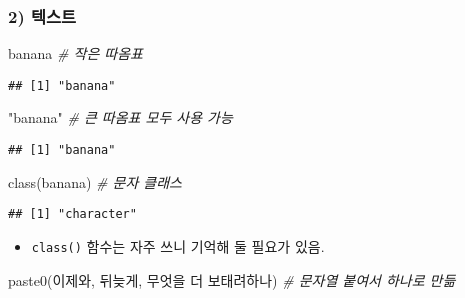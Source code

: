 \documentclass[
  12,
]{article}
\newenvironment{Shaded}{\begin{snugshade}}{\end{snugshade}}
\newcommand{\CommentTok}[1]{\textcolor[rgb]{0.56,0.35,0.01}{\textit{#1}}}
\newcommand{\FunctionTok}[1]{\textcolor[rgb]{0.00,0.00,0.00}{#1}}
\newcommand{\NormalTok}[1]{#1}
\newcommand{\StringTok}[1]{\textcolor[rgb]{0.31,0.60,0.02}{#1}}
\providecommand{\tightlist}{%
  \setlength{\itemsep}{0pt}\setlength{\parskip}{0pt}}
\begin{document}
\hypertarget{uxd14duxc2a4uxd2b8}{%
\subsubsection{2) 텍스트}\label{uxd14duxc2a4uxd2b8}}

\begin{Shaded}
\begin{Highlighting}[]
\StringTok{\textquotesingle{}banana\textquotesingle{}} \CommentTok{\# 작은 따옴표}
\end{Highlighting}
\end{Shaded}

\begin{verbatim}
## [1] "banana"
\end{verbatim}

\begin{Shaded}
\begin{Highlighting}[]
\StringTok{"banana"} \CommentTok{\# 큰 따옴표 모두 사용 가능}
\end{Highlighting}
\end{Shaded}

\begin{verbatim}
## [1] "banana"
\end{verbatim}

\begin{Shaded}
\begin{Highlighting}[]
\FunctionTok{class}\NormalTok{(}\StringTok{\textquotesingle{}banana\textquotesingle{}}\NormalTok{) }\CommentTok{\# 문자 클래스}
\end{Highlighting}
\end{Shaded}

\begin{verbatim}
## [1] "character"
\end{verbatim}

\begin{itemize}
\tightlist
\item
  \texttt{class()} 함수는 자주 쓰니 기억해 둘 필요가 있음.
\end{itemize}

\begin{Shaded}
\begin{Highlighting}[]
\FunctionTok{paste0}\NormalTok{(}\StringTok{\textquotesingle{}이제와\textquotesingle{}}\NormalTok{, }\StringTok{\textquotesingle{}뒤늦게\textquotesingle{}}\NormalTok{, }\StringTok{\textquotesingle{}무엇을 더 보태려하나\textquotesingle{}}\NormalTok{) }\CommentTok{\# 문자열 붙여서 하나로 만듦}
\end{Highlighting}
\end{Shaded}
\end{document}
